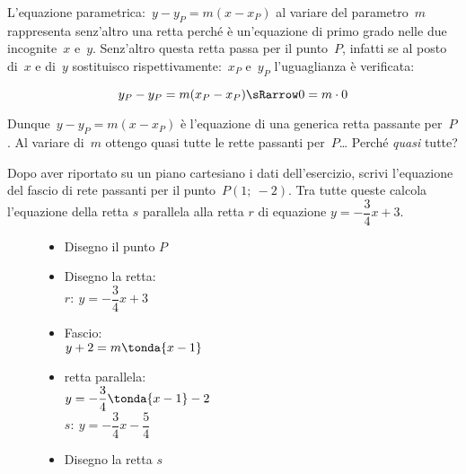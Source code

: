 L'equazione parametrica:~\(y - y_P = m (x - x_P)\) al variare del 
parametro~\(m\) 
rappresenta senz'altro una retta perché è un'equazione di primo grado nelle 
due incognite~\(x\) e~\(y\). Senz'altro questa retta passa per il punto~\(P\), 
infatti se al posto di~\(x\) e di~\(y\) sostituisco 
rispettivamente:~\(x_P\) e~\(y_P\) l'uguaglianza è verificata:

\[y_P - y_P = m (x_P - x_P) \sRarrow 0 = m \cdot 0\]

Dunque~\(y - y_P = m (x - x_P)\) è l'equazione di una generica retta passante 
per~\(P\). Al variare di~\(m\) ottengo quasi tutte le rette passanti 
per~\(P\)\dots 
Perché \emph{quasi} tutte?

 \begin{esempio}
  Dopo aver riportato su un piano cartesiano i dati dell'esercizio,
  scrivi l'equazione del fascio di rete passanti per il punto~\(P(1;~-2)\).
  Tra tutte queste calcola l'equazione della retta \(s\) parallela alla retta 
  \(r\) di equazione \(y=-\dfrac{3}{4}x+3\).

\begin{inaccessibleblock}
 \begin{figure}[h]
\centering \hspace{-5mm}
 \begin{minipage}[]{.40\textwidth}
  \begin{itemize}
  \item Disegno il punto \(P\) 
  \item Disegno la retta:\\
  \(r:~y=-\dfrac{3}{4}x+3\) 
  \item Fascio: \\
  \(y + 2 = m \tonda{x - 1}\)
  \item retta parallela: \\
  \(y = -\dfrac{3}{4} \tonda{x - 1} -2\)\\
  \(s:~y = -\dfrac{3}{4} x -\dfrac{5}{4}\)
  \item Disegno la retta \(s\)
  \end{itemize}
 \end{minipage}
 \begin{minipage}[]{.60\textwidth}
   \centering \fascioparall
 \end{minipage}
\label{fig:fascioparall}
\end{figure}
\end{inaccessibleblock}
 \end{esempio}
 
